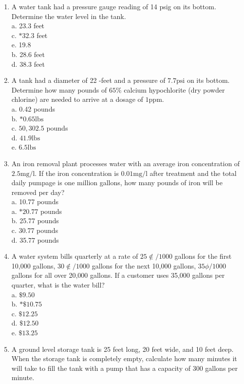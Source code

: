 \begin{enumerate}
\item A water tank had a pressure gauge reading of 14 psig on its bottom. Determine the water level in the tank.\\
a. 23.3 feet\\
c. $* 32.3$ feet\\
e. 19.8\\
b. 28.6 feet\\
d. 38.3 feet\\
\item A tank had a diameter of 22 -feet and a pressure of $7.7 \mathrm{psi}$ on its bottom. Determine how many pounds of $65 \%$ calcium hypochlorite (dry powder chlorine) are needed to arrive at a dosage of $1 \mathrm{ppm}$.\\
a. 0.42 pounds\\
b. $* 0.65 \mathrm{lbs}$\\
c. $50,302.5$ pounds\\
d. $41.9 \mathrm{lbs}$\\
e. $6.5 \mathrm{lbs}$\\
\item An iron removal plant processes water with an average iron concentration of $2.5 \mathrm{mg} / \mathrm{l}$. If the iron concentration is $0.01 \mathrm{mg} / \mathrm{l}$ after treatment and the total daily pumpage is one million gallons, how many pounds of iron will be removed per day?\\
a. 10.77 pounds\\
a. $* 20.77$ pounds\\
b. 25.77 pounds\\
c. 30.77 pounds\\
d. 35.77 pounds\\
\item A water system bills quarterly at a rate of $25 \notin / 1000$ gallons for the first 10,000 gallons, $30 \notin / 1000$ gallons for the next 10,000 gallons, $35 \phi / 1000$ gallons for all over 20,000 gallons. If a customer uses 35,000 gallons per quarter, what is the water bill?\\
a. $\$ 9.50$\\
b. $* \$ 10.75$\\
c. $\$ 12.25$\\
d. $\$ 12.50$\\
e. $\$ 13.25$\\
\item A ground level storage tank is 25 feet long, 20 feet wide, and 10 feet deep. When the storage tank is completely empty, calculate how many minutes it will take to fill the tank with a pump that has a capacity of 300 gallons per minute.\\

\end{enumerate}
